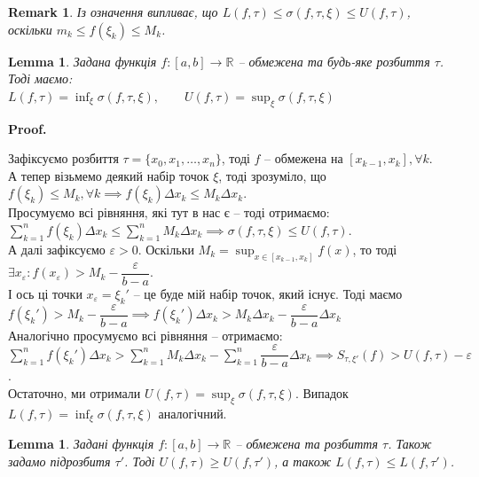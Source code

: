 \documentclass[a4paper, 10pt]{article}
\makeatletter
\def\huge{\displaystyle}
\theoremstyle{theoremdd}
\theoremstyle{theoremdd}
\theoremstyle{theoremdd}
\theoremstyle{theoremdd}
\theoremstyle{theoremdd}
\theoremstyle{theoremdd}
\theoremstyle{theoremdd}
\newtheorem{remark}[theorem]{Remark}
\theoremstyle{theoremdd}
\newtheorem{lemma}[theorem]{Lemma}
\theoremstyle{theoremdd}
\renewenvironment{proof}[1][Proof.\\]{\par
\pushQED{\hfill \qed}%
\normalfont \topsep6\p@\@plus6\p@\relax
\trivlist
\item\relax
{\bfseries
#1\@addpunct{.}}\hspace\labelsep\ignorespaces
}{%
\popQED\endtrivlist\@endpefalse
}
\makeatother
\begin{document}
\begin{remark}
Із означення випливає, що $L(f,\tau) \leq \sigma(f,\tau,\xi) \leq U(f,\tau)$, оскільки $m_k \leq f(\xi_k) \leq M_k$.
\end{remark}

\begin{lemma}
Задана функція $f \colon [a,b] \to \mathbb{R}$ -- обмежена та будь-яке розбиття $\tau$. Тоді маємо:\\
$L(f,\tau) = \huge\inf_{\xi} \sigma(f,\tau,\xi), \qquad U(f,\tau) = \huge\sup_{\xi} \sigma(f,\tau,\xi)$
\end{lemma}

\begin{proof}
Зафіксуємо розбиття $\tau = \{x_0,x_1,\dots,x_n\}$, тоді $f$ -- обмежена на $[x_{k-1},x_k], \forall k$.\\
А тепер візьмемо деякий набір точок $\xi$, тоді зрозуміло, що $f(\xi_k) \leq M_k, \forall k \implies f(\xi_k) \Delta x_k \leq M_k \Delta x_k$.\\
Просумуємо всі рівняння, які тут в нас є -- тоді отримаємо:\\
$\huge\sum_{k=1}^n f(\xi_k) \Delta x_k \leq \huge\sum_{k=1}^n M_k \Delta x_k \implies \sigma(f,\tau,\xi) \leq U(f, \tau)$.
\bigskip \\
А далі зафіксуємо $\varepsilon > 0$. Оскільки $M_k = \huge\sup_{x \in [x_{k-1},x_k]} f(x)$, то тоді $\exists x_\varepsilon: f(x_\varepsilon) > M_k - \dfrac{\varepsilon}{b-a}$.\\
І ось ці точки $x_\varepsilon = \xi_k'$ -- це буде мій набір точок, який існує. Тоді маємо\\
$f(\xi_k') > M_k - \dfrac{\varepsilon}{b-a} \implies f(\xi_k') \Delta x_k > M_k \Delta x_k - \dfrac{\varepsilon}{b-a} \Delta x_k$\\
Аналогічно просумуємо всі рівняння -- отримаємо:\\
$\huge\sum_{k=1}^n f(\xi_k') \Delta x_k > \sum_{k=1}^n M_k \Delta x_k - \sum_{k=1}^n \dfrac{\varepsilon}{b-a} \Delta x_k \implies S_{\tau, \xi'}(f) > U(f,\tau) - \varepsilon$.\\
Остаточно, ми отримали $U(f, \tau) = \huge\sup_\xi \sigma(f,\tau,\xi)$. Випадок $L(f,\tau) = \huge\inf_\xi \sigma(f,\tau,\xi)$ аналогічний.
\end{proof}

\begin{lemma}
Задані функція $f \colon [a,b] \to \mathbb{R}$ -- обмежена та розбиття $\tau$. Також задамо підрозбитя $\tau'$. Тоді $U(f,\tau) \geq U(f,\tau')$, а також $L(f,\tau) \leq L(f,\tau')$.
\end{lemma}
\end{document}
